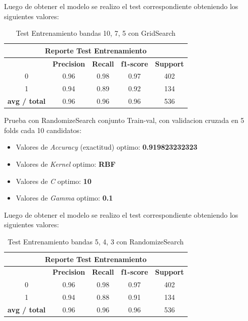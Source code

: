 Luego de obtener el modelo se realizo el test correspondiente obteniendo los siguientes valores:
\begin{table}[H]
\begin{center}
\begin{tabular}{|c|c|c|c|c|}
\hline \multicolumn{5}{|c|}{Reporte Test Entrenamiento} \\ \hline
\hline \textbf{} & \textbf{Precision} & \textbf{Recall} & \textbf{f1-score} & \textbf{Support}\\ \hline 
				 0   & 0.96 & 0.98 & 0.97  & 402	\\ \hline 
				 1   & 0.94 & 0.89 & 0.92  & 134 \\ \hline 
\textbf{avg / total} & 0.96 & 0.96 & 0.96  & 536 \\ \hline
\end{tabular}
\end{center} \caption{Test Entrenamiento bandas 10, 7, 5 con GridSearch}\label{tab:gridsearchtest1075}
\end{table}


Prueba con RandomizeSearch conjunto Train-val, con validacion cruzada en 5 folds cada 10 candidatos:

\begin{itemize}
\item Valores de \textit{Accuracy} (exactitud) optimo: \textbf{0.919823232323}
\item Valores de \textit{Kernel} optimo: \textbf{RBF}
\item Valores de \textit{C} optimo: \textbf{10} 	
\item Valores de \textit{Gamma} optimo: \textbf{0.1}

\end{itemize}

Luego de obtener el modelo se realizo el test correspondiente obteniendo los siguientes valores:
\begin{table}[H]
\begin{center}
\begin{tabular}{|c|c|c|c|c|}
\hline \multicolumn{5}{|c|}{Reporte Test Entrenamiento} \\ \hline
\hline \textbf{} & \textbf{Precision} & \textbf{Recall} & \textbf{f1-score} & \textbf{Support}\\ \hline 
				 0   & 0.96 & 0.98 & 0.97  & 402	\\ \hline 
				 1   & 0.94 & 0.88  & 0.91 & 134 \\ \hline 
\textbf{avg / total} & 0.96 & 0.96 & 0.96  & 536 \\ \hline
\end{tabular}
\end{center} \caption{Test Entrenamiento bandas 5, 4, 3 con RandomizeSearch}\label{tab:RandomTest1075}
\end{table}


